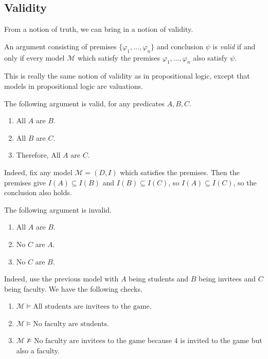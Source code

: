 \documentclass[../notes.tex]{subfiles}
\begin{document}
\subsection{Validity}
From a notion of truth, we can bring in a notion of validity.
\begin{definition}[Valid]
	An argument consisting of premises $\{\varphi_1,\ldots,\varphi_n\}$ and conclusion $\psi$ is \textit{valid} if and only if every model $\mathcal M$ which satisfy the premises $\varphi_1,\ldots,\varphi_n$ also satisfy $\psi$.
\end{definition}
\begin{remark}
	This is really the same notion of validity as in propositional logic, except that models in propositional logic are valuations.
\end{remark}
\begin{ex}
	The following argument is valid, for any predicates $A,B,C$.
	\begin{enumerate}
		\item \textrm{All $A$ are $B$}.
		\item \textrm{All $B$ are $C$}.
		\item Therefore, \textrm{All $A$ are $C$}.
	\end{enumerate}
	Indeed, fix any model $\mathcal M=(D,I)$ which satisfies the premises. Then the premises give $I(A)\subseteq I(B)$ and $I(B)\subseteq I(C)$, so $I(A)\subseteq I(C)$, so the conclusion also holds.
\end{ex}
\begin{nex}
	The following argument is invalid.
	\begin{enumerate}
		\item \textrm{All $A$ are $B$}.
		\item \textrm{No $C$ are $A$}.
		\item \textrm{No $C$ are $B$}.
	\end{enumerate}
	Indeed, use the previous model with $A$ being students and $B$ being invitees and $C$ being faculty. We have the following checks.
	\begin{enumerate}
		\item $\mathcal M\models\textrm{All students are invitees to the game}$.
		\item $\mathcal M\models\textrm{No faculty are students}$.
		\item $\mathcal M\not\models\textrm{No faculty are invitees to the game}$ because $4$ is invited to the game but also a faculty.
	\end{enumerate}
\end{nex}
\end{document}
